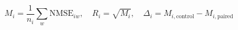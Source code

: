 \documentclass{article}
\begin{document}
\fontsize{22}{29}\selectfont
\[
M_i=\frac{1}{n_i}\sum_w\mathrm{NMSE}_{iw},\quad R_i=\sqrt{M_i},\quad\Delta_i=M_{i,\mathrm{control}}-M_{i,\mathrm{paired}}
\]
\end{document}
